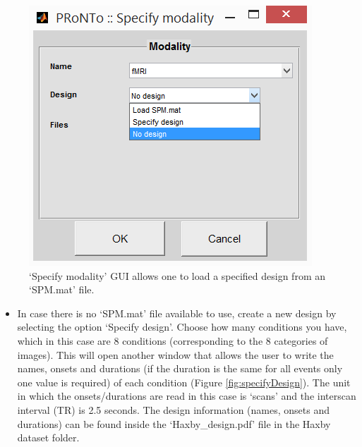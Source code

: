 \begin{itemize}
\begin{figure}[!h]
	\centering
		\includegraphics[scale=0.7]{images/Tutorial/classification/modality.png}
	\caption{`Specify modality' GUI allows one to load a specified design from an `SPM.mat' file.}
	\label{fig:modality}
\end{figure}

	\begin{itemize}
	
		\item In case there is no `SPM.mat' file available to use, create a new design by selecting the option `Specify design'. Choose how many conditions you have, which in this case are 8 conditions (corresponding to the 8 categories of images). This will open another window that allows the user to write the names, onsets and durations (if the duration is the same for all events only one value is required) of each condition (Figure \ref{fig:specifyDesign}). The unit in which the onsets/durations are read in this case is `scans' and the interscan interval (TR) is 2.5 seconds. The design information (names, onsets and durations) can be found inside the `Haxby\_design.pdf' file in the Haxby dataset folder. 
	
	\end{itemize}
	

\end{itemize}

